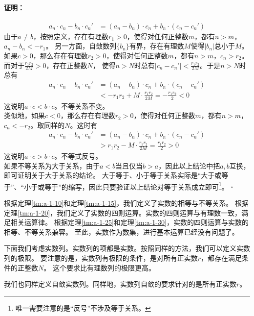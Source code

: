 \documentclass[12pt,UTF8]{ctexbook}
\renewenvironment{proof}{\paragraph{\textbf{证明：}}}{\hfill$\square$}
\begin{document}
\begin{appendix}
\begin{proof}
    \begin{align*}
        a_n\cdot c_n - b_n\cdot c_n' &= (a_n - b_n)\cdot c_n + b_n\cdot(c_n - c_n')  
    \end{align*}
    由于$a\neq b$，按照定义，存在有理数$r_1>0$，使得对任何正整数$m$，都有$n>m$，$a_n - b_n < -r_1$。
    另一方面，自敛数列$\{b_n\}$有界，存在有理数$M$使得$|b_n|$总小于$M$。\\
    如果$c > 0$，那么存在有理数$r_2>0$，使得对任何正整数$m$，都有$n>m$，$c_n > r_2$。
    而对于$\frac{r_1r_2}{2M}>0$，存在正整数$N$，
    使得$n>N$时总有$|c_n - c_n'| < \frac{r_1r_2}{2M}$。于是$n>N$时总有
    \begin{align*}
        a_n\cdot c_n - b_n\cdot c_n' &= (a_n - b_n)\cdot c_n + b_n\cdot(c_n - c_n')  \\
        &< -r_1r_2 + M\cdot\frac{r_1r_2}{2M} = -\frac{r_1r_2}{2} < 0 
    \end{align*}
    这说明$a\cdot c < b\cdot c$。不等关系不变。\\
    类似地，如果$c < 0$，那么存在有理数$r_2>0$，使得对任何正整数$m$，都有$n>m$，$c_n < -r_2$。取同样的$N$。这时有
    \begin{align*}
        a_n\cdot c_n - b_n\cdot c_n' &= (a_n - b_n)\cdot c_n + b_n\cdot(c_n - c_n')  \\
        &> r_1r_2 - M\cdot\frac{r_1r_2}{2M} = \frac{r_1r_2}{2} > 0 
    \end{align*}
    这说明$a\cdot c > b\cdot c$。不等式反号。\\
    如果不等关系为大于关系，由于$a<b$当且仅当$b>a$，因此以上结论中把$a,b$互换，即可证明关于大于关系的结论。
    大于等于、小于等于关系实际是“大于或等于”、“小于或等于”的缩写，因此只要验证以上结论对等于关系成立即可\footnote{唯一需要注意的是“反号”不涉及等于关系。}。
\end{proof}

根据定理\ref{tm:a-1-10}和定理\ref{tm:a-1-15}，我们定义了实数的相等与不等关系。
根据定理\ref{tm:a-1-20}，我们定义了实数的四则运算。实数的四则运算与有理数一致，满足相关运算律。
根据定理\ref{tm:a-1-25}和定理\ref{tm:a-1-30}，实数的四则运算与实数的相等、不等关系兼容。
至此，实数作为数集，进行基本运算已经没有问题了。

下面我们考虑实数列。实数列的项都是实数。按照同样的方法，我们可以定义实数列的极限。
要注意的是，实数列有极限的条件，是对所有正实数$r$，都存在满足条件的正整数$N$。
这个要求比有理数列的极限更高。

我们也同样定义自敛实数列。同样地，实数列自敛的要求针对的是所有正实数$r$。


\end{appendix}
\end{document}
